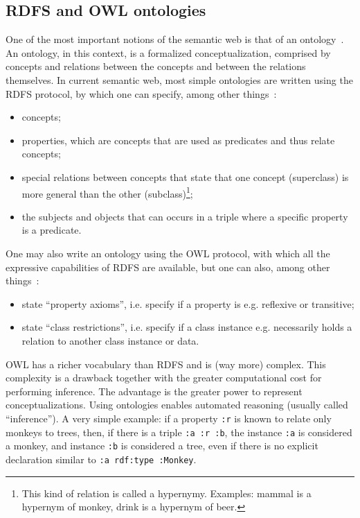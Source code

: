 \documentclass[data,datadescriptor,submit,moreauthors,pdftex]{Definitions/mdpi}
\newcommand{\te}[1] {\texttt{\footnotesize#1}}
\begin{document}
\subsection{RDFS and OWL ontologies}\label{sont}
One of the most important notions of the semantic web is that of an ontology~\cite{ont}.
An ontology, in this context, is a formalized conceptualization, comprised by
concepts and relations between the concepts and between the relations themselves.
In current semantic web, most simple ontologies are written using the RDFS protocol,
by which one can specify, among other things~\cite{rdfs}:
\begin{itemize}
  \item concepts;
  \item properties, which are concepts that are used as predicates and thus relate concepts;
  \item special relations between concepts that state that one concept (superclass) is more general than the other (subclass)\footnote{This
          kind of relation is called a hypernymy. Examples: mammal is a hypernym of monkey, drink is a hypernym of beer.};
  \item the subjects and objects that can occurs in a triple where a specific property is a predicate.
\end{itemize}

One may also write an ontology using the OWL protocol,
with which all the expressive capabilities of RDFS are
available, but one can also, among other things~\cite{ont}:
\begin{itemize}
  \item state ``property axioms'', i.e. specify if a property is e.g. reflexive or transitive;
  \item state ``class restrictions'', i.e. specify if a class instance e.g. necessarily holds a relation to another class instance or data.
\end{itemize}
OWL has a richer vocabulary than RDFS and is (way more) complex.
This complexity is a drawback together with the greater computational cost
for performing inference.
The advantage is the greater power to represent conceptualizations.
Using ontologies enables automated reasoning (usually called ``inference'').
A very simple example: if a property \te{:r} is known to relate only monkeys to trees,
then, if there is a triple \te{:a :r :b}, the instance \te{:a} is considered a monkey,
and instance \te{:b} is considered a tree,
even if there is no explicit declaration similar
to \te{:a rdf:type :Monkey}.
\end{document}
